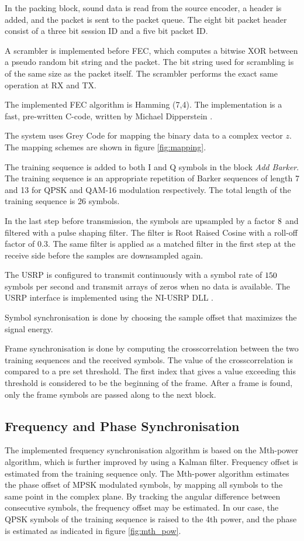 In the packing block, sound data is read from the source encoder, a header is added, and the packet is sent to the packet queue. The eight bit packet header consist of a three bit session ID and a five bit packet ID. 

A scrambler is implemented before FEC, which computes a bitwise XOR between a pseudo random bit string and the packet. The bit string used for scrambling is of the same size as the packet itself. The scrambler performs the exact same operation at RX and TX.

The implemented FEC algorithm is Hamming (7,4). The implementation is a fast, pre-written C-code, written by Michael Dipperstein \cite{hamming}. 

The system uses Grey Code for mapping the binary data to a complex vector $z$. The mapping schemes are shown in figure \ref{fig:mapping}.



The training sequence is added to both I and Q symbols in the block \textit{Add Barker}. The training sequence is an appropriate repetition of Barker sequences of length 7 and 13 for QPSK and QAM-16 modulation respectively. The total length of the training sequence is 26 symbols. 

In the last step before transmission, the symbols are upsampled by a factor $8$ and filtered with a pulse shaping filter. The filter is Root Raised Cosine with a roll-off factor of 0.3. The same filter is applied as a matched filter in the first step at the receive side before the samples are downsampled again. 

The USRP is configured to transmit continuously with a symbol rate of $150$ symbols per second and transmit arrays of zeros when no data is available. The USRP interface is implemented using the NI-USRP DLL \cite{labviewDLL}.

Symbol synchronisation is done by choosing the sample offset that maximizes the signal energy. 

Frame synchronisation is done by computing the crosscorrelation between the two training sequences and the received symbols. The value of the crosscorrelation is compared to a pre set threshold. The first index that gives a value exceeding this threshold is considered to be the beginning of the frame. After a frame is found, only the frame symbols are passed along to the next block.

\subsection{Frequency and Phase Synchronisation}
The implemented frequency synchronisation algorithm is based on the Mth-power algorithm, which is further improved by using a Kalman filter. Frequency offset is estimated from the training sequence only. The Mth-power algorithm estimates the phase offset of MPSK modulated symbols, by mapping all symbols to the same point in the complex plane. By tracking the angular difference between consecutive symbols, the frequency offset may be estimated. In our case, the QPSK symbols of the training sequence is raised to the 4th power, and the phase is estimated as indicated in figure \ref{fig:mth_pow}.


